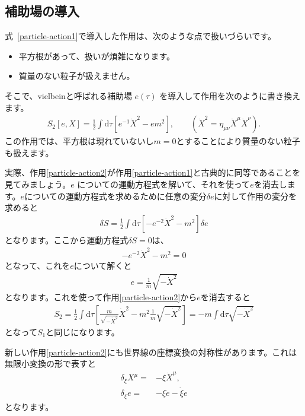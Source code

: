 \documentclass[report,paper=a4, fontsize=12pt, line_length=16cm, number_of_lines=34,dvipdfmx]{jlreq}
\numberwithin{equation}{chapter}
\numberwithin{equation}{section}
\newcommand{\di}{\mathrm{d}}
\begin{document}
\subsection{補助場の導入}
式~\eqref{particle-action1}で導入した作用は、次のような点で扱いづらいです。
\begin{itemize}
 \item 平方根があって、扱いが煩雑になります。
 \item 質量のない粒子が扱えません。
\end{itemize}
そこで、vielbeinと呼ばれる補助場 $e(\tau)$ を導入して作用を次のように書き換えます。
\begin{align}
 S_{2}[e,X]=\frac12 \int \di \tau\left[
e^{-1}\dot{X}^2-em^2
\right],\qquad (\dot{X}^2=\eta_{\mu\nu}\dot{X}^{\mu}\dot{X}^{\nu}).
\label{particle-action2}
\end{align}
この作用では、平方根は現れていないし$m=0$とすることにより質量のない粒子も扱えます。

実際、作用\eqref{particle-action2}が作用\eqref{particle-action1}と古典的に同等であることを見てみましょう。$e$ についての運動方程式を解いて、それを使って$e$を消去します。$e$についての運動方程式を求めるために任意の変分$\delta e$に対して作用の変分を求めると
\begin{align}
 \delta S=\frac12 \int \di \tau\left[
-e^{-2}\dot{X}^2-m^2
\right]\delta e
\end{align}
となります。ここから運動方程式$\delta S=0$は、
\begin{align}
 -e^{-2}\dot{X}^2-m^2=0
\end{align}
となって、これを$e$について解くと
\begin{align}
 e=\frac{1}{m}\sqrt{-\dot{X}^2}
\end{align}
となります。これを使って作用\eqref{particle-action2}から$e$を消去すると
\begin{align}
 S_2=\frac12\int \di \tau\left[
\frac{m}{\sqrt{-\dot{X}^2}}\dot{X}^2
-m^2\frac{1}{m}\sqrt{-\dot{X}^2}
\right]=-m\int \di \tau\sqrt{-\dot{X}^2}
\end{align}
となって$S_1$と同じになります。

新しい作用\eqref{particle-action2}にも世界線の座標変換の対称性があります。これは無限小変換の形で表すと
\begin{equation}
\begin{aligned}
 \delta_{\xi}X^{\mu}=&-\xi \dot{X}^{\mu},\\
\delta_{\xi}e=&-\xi \dot{e}-\dot{\xi} e
\end{aligned} \label{reparam2}
\end{equation}
となります。
\end{document}
